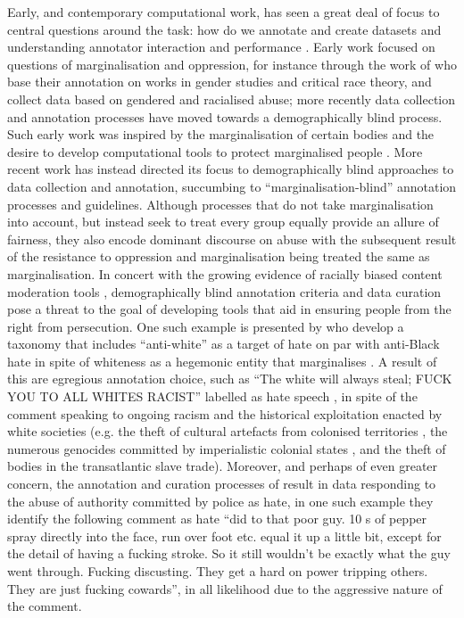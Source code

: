 Early, and contemporary computational work, has seen a great deal of focus to central questions around the task: how do we annotate and create datasets \citep{Waseem-Hovy:2016,Waseem:2017,Vidgen:2020} and understanding annotator interaction and performance \citep{Ross:2016,Waseem:2016,Vidgen_learning:2020}.
Early work focused on questions of marginalisation and oppression, for instance through the work of \citet{Waseem-Hovy:2016} who base their annotation on works in gender studies and critical race theory, and collect data based on gendered and racialised abuse; more recently data collection and annotation processes have moved towards a demographically blind process. 
Such early work was inspired by the marginalisation of certain bodies and the desire to develop computational tools to protect marginalised people \citep{Warner:2012}.
More recent work has instead directed its focus to demographically blind approaches to data collection and annotation, succumbing to ``marginalisation-blind'' annotation processes and guidelines. 
Although processes that do not take marginalisation into account, but instead seek to treat every group equally provide an allure of fairness, they also encode dominant discourse on abuse with the subsequent result of the resistance to oppression and marginalisation being treated the same as marginalisation. 
In concert with the growing evidence of racially biased content moderation tools \citep{Waseem:2018,Davidson:2019}, demographically blind annotation criteria and data curation pose a threat to the goal of developing tools that aid in ensuring people from the right from persecution. 
One such example is presented by \citet{Salminen:2018} who develop a taxonomy that includes ``anti-white'' as a target of hate on par with anti-Black hate in spite of whiteness as a hegemonic entity that marginalises \citep{McIntosh:1988}.
A result of this are egregious annotation choice, such as ``The  white  will  always  steal;  FUCK  YOU  TO  ALL  WHITES  RACIST'' labelled as hate speech \citep{Salminen:2018}, in spite of the comment speaking to ongoing racism and the historical exploitation enacted by white societies (e.g. the theft of cultural artefacts from colonised territories \citep{Frost:2019}, the numerous genocides committed by imperialistic colonial states \citep{Weisbord:2003}, and the theft of bodies in the transatlantic slave trade). 
Moreover, and perhaps of even greater concern, the annotation and curation processes of \citet{Salminen:2018} result in data responding to the abuse of authority committed by police as hate, in one such example they identify the following comment as hate ``did to that poor guy. 10 s of pepper spray directly into the face, run over foot etc. equal it up a little bit, except for the detail of having a fucking stroke. So it still wouldn’t be exactly what the guy went through. Fucking discusting. They get a hard on power tripping others. They are just fucking cowards'', in all likelihood due to the aggressive nature of the comment.

